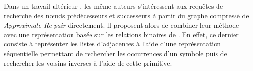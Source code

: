 	Dans un travail ultérieur \citep{claude2010extended} , les même auteurs s'intéressent aux requêtes de recherche des nœuds prédécesseurs et successeurs à partir du graphe compressé de \textit{Approximate Re-pair} directement. Il proposent alors de combiner leur méthode avec une représentation basée sur les relations binaires de \citep{barbay2006adaptive}. En effet, ce dernier consiste à représenter les listes d'adjacences à l'aide d'une représentation séquentielle permettant de rechercher les occurrences d'un symbole puis de rechercher les voisins inverses à l'aide de cette primitive. 